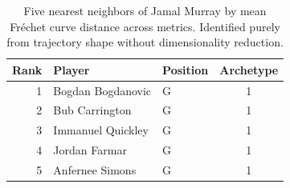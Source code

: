 \begin{table}[htbp]
  \centering\small
  \begin{tabular}{rllc}
    \toprule
    Rank & Player & Position & Archetype \\
    \midrule
    1 & Bogdan Bogdanovic & G & 1 \\
    2 & Bub Carrington & G & 1 \\
    3 & Immanuel Quickley & G & 1 \\
    4 & Jordan Farmar & G & 1 \\
    5 & Anfernee Simons & G & 1 \\
    \bottomrule
  \end{tabular}
  \caption{Five nearest neighbors of Jamal Murray by mean Fr\'{e}chet curve distance across metrics. Identified purely from trajectory shape without dimensionality reduction.}
  \label{tab:Jamal_Murray_frechet_curve_neighbors}
\end{table}

